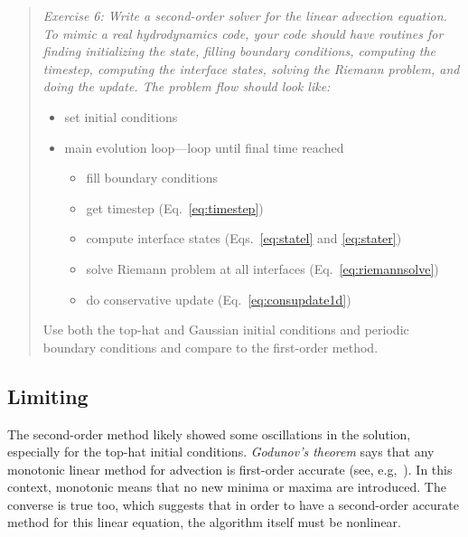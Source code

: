 \documentclass[11pt]{article}
\begin{document}
\begin{quote}
{\em Exercise 6: Write a second-order solver for the linear advection
  equation.  To mimic a real hydrodynamics code, your code should have
  routines for finding initializing the state, filling boundary conditions,
  computing the timestep,
  computing the interface states, solving the Riemann problem, and
  doing the update.  The problem flow should look like:
  \begin{itemize}
    \item set initial conditions
    \item main evolution loop---loop until final time reached
    \begin{itemize}
      \item fill boundary conditions
      \item get timestep (Eq.~\ref{eq:timestep})
      \item compute interface states (Eqs.~\ref{eq:statel} and \ref{eq:stater})
      \item solve Riemann problem at all interfaces (Eq.~\ref{eq:riemannsolve})
      \item do conservative update (Eq.~\ref{eq:consupdate1d})
    \end{itemize}
  \end{itemize}
Use both the top-hat and Gaussian initial conditions and periodic boundary
conditions and compare to the first-order method.
}
\end{quote}

\subsection{Limiting}

The second-order method likely showed some oscillations in the
solution, especially for the top-hat initial conditions.  {\em
  Godunov's theorem} says that any monotonic linear method for
advection is first-order accurate (see, e.g,~\cite{laney}).  In this
context, monotonic means that no new minima or maxima are introduced.
The converse is true too, which suggests that in order to have a
second-order accurate method for this linear equation, the algorithm
itself must be nonlinear.
\end{document}
